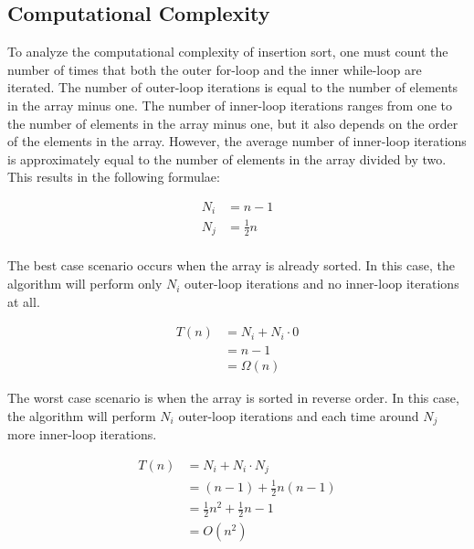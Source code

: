 \subsection{Computational Complexity}

To analyze the computational complexity of insertion sort, one must count the number of times that both the outer for-loop and the inner while-loop are iterated. The number of outer-loop iterations is equal to the number of elements in the array minus one. The number of inner-loop iterations ranges from one to the number of elements in the array minus one, but it also depends on the order of the elements in the array. However, the average number of inner-loop iterations is approximately equal to the number of elements in the array divided by two. This results in the following formulae:

\begin{equation*}
    \begin{aligned}
        N_i &= n - 1 \\
        N_j &= \frac{1}{2}n \\
    \end{aligned}
\end{equation*}

The best case scenario occurs when the array is already sorted. In this case, the algorithm will perform only $N_i$ outer-loop iterations and no inner-loop iterations at all.

\begin{equation*}
    \begin{aligned}
        T(n) &= N_i + N_i \cdot 0 \\
        &= n - 1 \\
        &= \Omega(n)
    \end{aligned}
\end{equation*}

The worst case scenario is when the array is sorted in reverse order. In this case, the algorithm will perform $N_i$ outer-loop iterations and each time around $N_j$ more inner-loop iterations.

\begin{equation*}
    \begin{aligned}
        T(n) &= N_i + N_i \cdot N_j \\
        &= (n - 1) + \frac{1}{2}n(n - 1) \\
        &= \frac{1}{2}n^2 + \frac{1}{2}n - 1 \\
        &= O(n^2)
    \end{aligned}
\end{equation*}


